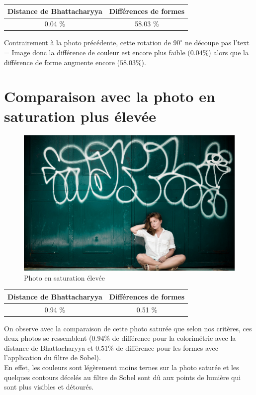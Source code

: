 \documentclass[]{article}
\begin{document}
\begin{center}
\begin{tabular}{|c|c|}
  \hline
  Distance de Bhattacharyya & Différences de formes \\
  \hline
  0.04 \% & 58.03 \% \\
  \hline
\end{tabular}
\end{center}

Contrairement à la photo précédente, cette rotation de $90^{\circ}$ ne
découpe pas l'text = Image donc la différence de couleur est encore plus faible
($0.04 \%$) alors que la différence de forme augmente encore ($58.03 \%$).

\newpage

\section{Comparaison avec la photo en saturation plus
élevée}\label{comparaison-avec-la-photo-en-saturation-plus-uxe9levuxe9e}

\begin{figure}[htbp]
\centering
\includegraphics{photos/saturate.jpg}
\caption{Photo en saturation élevée}
\end{figure}

\begin{center}
\begin{tabular}{|c|c|}
  \hline
  Distance de Bhattacharyya & Différences de formes \\
  \hline
  0.94 \% & 0.51 \% \\
  \hline
\end{tabular}
\end{center}

On observe avec la comparaison de cette photo saturée que selon nos
critères, ces deux photos se ressemblent ($0.94 \%$ de différence pour la
colorimétrie avec la distance de Bhattacharyya et $0.51 \%$ de différence
pour les formes avec l'application du filtre de Sobel).\\En effet, les
couleurs sont légèrement moins ternes sur la photo saturée et les
quelques contours décelés au filtre de Sobel sont dû aux points de
lumière qui sont plus visibles et détourés.
\end{document}
